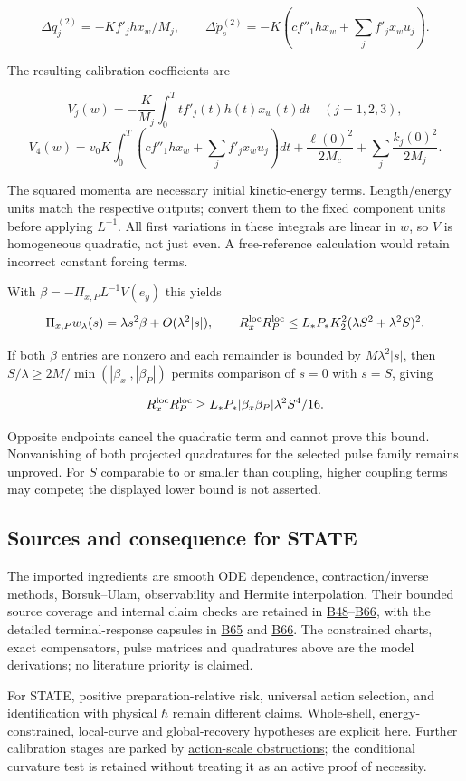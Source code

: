 \documentclass[11pt,a4paper]{article}
\begin{document}
\[\Delta\ddot q_j^{(2)}=-Kf'_jh x_w/M_j,\qquad
\Delta\dot p_s^{(2)}=-K(c f''_1h x_w+\sum_j f'_jx_wu_j).\]

The resulting calibration coefficients are

\[V_j(w)=-\frac K{M_j}\int_0^Tt f'_j(t)h(t)x_w(t)dt\quad(j=1,2,3),\]
\[V_4(w)=v_0K\int_0^T(c f''_1h x_w+\sum_jf'_jx_wu_j)dt
 +\frac{\ell(0)^2}{2M_c}+\sum_j\frac{k_j(0)^2}{2M_j}.\]

The squared momenta are necessary initial kinetic-energy terms.
Length/energy units match the respective outputs; convert them to the
fixed component units before applying \(L^{-1}\). All first variations
in these integrals are linear in \(w\), so \(V\) is homogeneous
quadratic, not just even. A free-reference calculation would retain
incorrect constant forcing terms.

With \(\beta=-\Pi_{x,P}L^{-1}V(e_y)\) this yields

\[\Pi_{x,P}w_\lambda(s)=\lambda s^2\beta+O(\lambda^2|s|),\qquad
R_x^{\rm loc}R_P^{\rm loc}
 \le L_*P_*K_2^2(\lambda S^2+\lambda^2S)^2.\]

If both \(\beta\) entries are nonzero and each remainder is bounded by
\(M\lambda^2|s|\), then \(S/\lambda\ge2M/\min(|\beta_x|,|\beta_P|)\)
permits comparison of \(s=0\) with \(s=S\), giving

\[R_x^{\rm loc}R_P^{\rm loc}\ge
 L_*P_*|\beta_x\beta_P|\lambda^2S^4/16.\]

Opposite endpoints cancel the quadratic term and cannot prove this
bound. Nonvanishing of both projected quadratures for the selected pulse
family remains unproved. For \(S\) comparable to or smaller than
coupling, higher coupling terms may compete; the displayed lower bound
is not asserted.

\hypertarget{sources-and-consequence-for-state}{%
\subsection{Sources and consequence for
STATE}\label{sources-and-consequence-for-state}}

The imported ingredients are smooth ODE dependence, contraction/inverse
methods, Borsuk--Ulam, observability and Hermite interpolation. Their
bounded source coverage and internal claim checks are retained in
\href{../references/batches/B48.md}{B48}--\href{../references/batches/B66.md}{B66},
with the detailed terminal-response capsules in
\href{../references/batches/B65.md}{B65} and
\href{../references/batches/B66.md}{B66}. The constrained charts, exact
compensators, pulse matrices and quadratures above are the model
derivations; no literature priority is claimed.

For STATE, positive preparation-relative risk, universal action
selection, and identification with physical \(\hbar\) remain different
claims. Whole-shell, energy-constrained, local-curve and global-recovery
hypotheses are explicit here. Further calibration stages are parked by
\href{action-unit-dimensional-selection.md\#observables-and-the-admissible-class}{action-scale
obstructions}; the conditional curvature test is retained without
treating it as an active proof of necessity.
\end{document}
